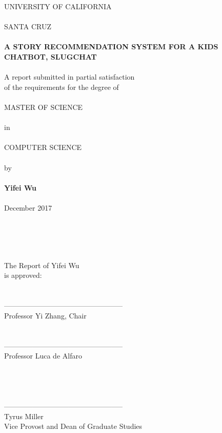 \documentclass[sigconf]{acmart}
\begin{document}
\begin{center}
UNIVERSITY OF CALIFORNIA\\
\ \\
SANTA CRUZ\\
\ \\
{\bf A STORY RECOMMENDATION SYSTEM FOR A KIDS CHATBOT, SLUGCHAT}\\
\ \\
A report submitted in partial satisfaction\\
of the requirements for the degree of\\
\ \\
MASTER OF SCIENCE\\
\ \\
in\\
\ \\
COMPUTER SCIENCE\\
\ \\
by\\
\ \\
{\bf Yifei Wu}\\
\ \\
December 2017\\
\ \\
\ \\
\ \\
\end{center}

{\addtolength{\leftskip}{120 mm}
\ \\
The Report of Yifei Wu \\
is approved:\\
\ \\
\ \\
--------------------------------------------------\\
Professor Yi Zhang, Chair\\
\ \\
\ \\
--------------------------------------------------\\
Professor Luca de Alfaro\\

}
\ \\
\ \\
\ \\
\ \\
--------------------------------------------------\\
Tyrus Miller\\
Vice Provost and Dean of Graduate Studies

\pagebreak[4]
\end{document}
